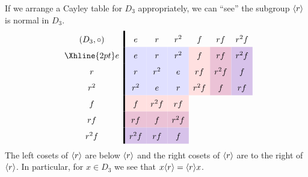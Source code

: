 \documentclass{ximera}
\begin{document}
\begin{example}
  If we arrange a Cayley table for $D_3$ appropriately, we can ``see''
  the subgroup $\langle r\rangle$ is normal in $D_3$.
    \[
    \renewcommand{\arraystretch}{1.6}
    \begin{array}{c!{\vline width 2pt}cccccc}
      (D_3,\circ)& e                              & r                              & r^2                            & f                             & r f                                   & r^2 f  \\  \Xhline{2pt}
      e          & e\cellcolor{blue!12!white}     & r\cellcolor{blue!12!white}    & r^2\cellcolor{blue!12!white}   & f \cellcolor{red!12!white}    & r f \cellcolor{blue!33!red!24!white}   & r^2f \cellcolor{blue!66!red!24!white} \\  
      r                                  & r\cellcolor{blue!12!white}    & r^2\cellcolor{blue!12!white}   & e \cellcolor{blue!12!white}    & rf\cellcolor{red!12!white} & r^2f \cellcolor{blue!33!red!24!white}    & f \cellcolor{blue!66!red!24!white}   \\  
      r^2                                 & r^2\cellcolor{blue!12!white}   & e\cellcolor{blue!12!white}     & r\cellcolor{blue!12!white}    & r^2 f \cellcolor{red!12!white}   & f \cellcolor{blue!33!red!24!white} & rf \cellcolor{blue!66!red!24!white}   \\  
      f        & f \cellcolor{red!12!white}    & r^2f \cellcolor{red!12!white}   & r f \cellcolor{red!12!white} &     &   &   \\  
      r f       & rf \cellcolor{blue!33!red!24!white}   & f \cellcolor{blue!33!red!24!white} & r^2f \cellcolor{blue!33!red!24!white}   &    &      &     \\  
      r^2 f       & r^2 f\cellcolor{blue!66!red!24!white} & rf \cellcolor{blue!66!red!24!white}    & f \cellcolor{blue!66!red!24!white}  &     &     &      \\  
    \end{array}
    \]
    The left cosets of $\langle r\rangle$ are below $\langle r\rangle$ and the right cosets
    of $\langle r\rangle$ are to the right of $\langle r\rangle$. In particular, for $x\in
    D_3$ we see that $x\langle r\rangle = \langle r\rangle x$.
\end{example}
\end{document}
